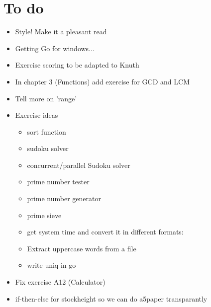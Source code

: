 \section{To do}

\begin{itemize}
\item
Style! Make it a pleasant read
\item
Getting Go for windows...
\item
Exercise scoring to be adapted to Knuth
\item
In chapter 3 (Functions) add exercise for GCD and LCM
\item
Tell more on 'range'
\item
Exercise ideas
\begin{itemize}
\item
sort function
\item
sudoku solver
\item
concurrent/parallel Sudoku solver
\item
prime number tester
\item
prime number generator
\item
prime sieve
\item
get system time and convert it in different formats:
\item
Extract uppercase words from a file
\item
write uniq in go
\end{itemize}
\item
Fix exercise A12 (Calculator)
\item
if-then-else for stockheight so we can do a5paper transparantly
\end{itemize}

